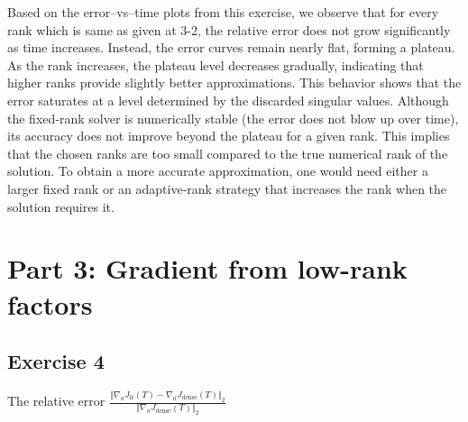 \documentclass[11pt]{article}
\begin{document}
Based on the error–vs–time plots from this exercise, we observe that for every rank which is same as given at 3-2,  the relative error does not grow significantly as time increases. Instead, the error curves remain nearly flat, forming a plateau. As the rank increases, the plateau level decreases gradually, indicating that higher ranks provide slightly better approximations. This behavior shows that the error saturates at a level determined by the discarded singular values.
\vspace{0.8em}
Although the fixed‑rank solver is numerically stable (the error does not blow up over time), its accuracy does not improve beyond the plateau for a given rank. This implies that the chosen ranks are too small compared to the true numerical rank of the solution. To obtain a more accurate approximation, one would need either a larger fixed rank or an adaptive‑rank strategy that increases the rank when the solution requires it.

\section*{Part 3: Gradient from low-rank factors}
\subsection*{Exercise 4}

The relative error $\frac{\Vert \nabla_{a} J_{\text{lr}}(T) - \nabla_{a} J_{\text{dense}}(T) \Vert_{2}}{\Vert \nabla_{a} J_{\text{dense}}(T) \Vert_{2}}$ 
\end{document}

